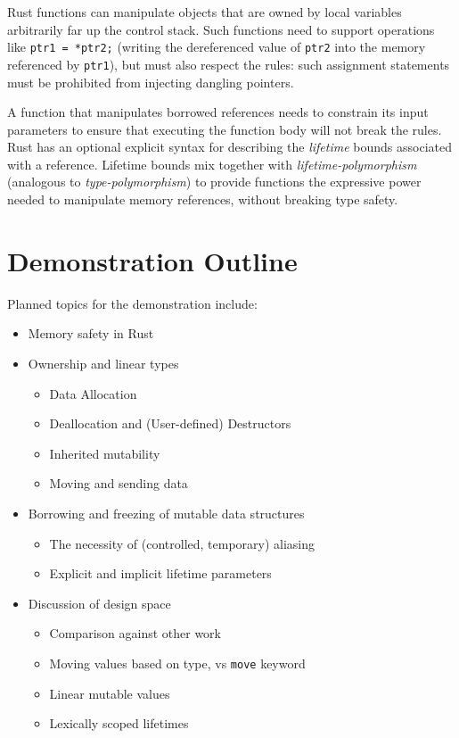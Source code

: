 \documentclass{acm_proc_article-sp}
\begin{document}
Rust functions can manipulate objects that are owned by local
variables arbitrarily far up the control stack.  Such functions need to
support operations like {\tt *ptr1 = *ptr2;} (writing the dereferenced
value of {\tt ptr2} into the memory referenced by {\tt ptr1}), but must
also respect the rules: such assignment statements
must be prohibited from injecting dangling pointers.

A function that manipulates borrowed references needs to
constrain its input parameters to ensure that
executing the function body will not break the rules.
%
Rust has an optional explicit syntax for describing the {\em lifetime}
bounds associated with a reference. Lifetime bounds mix together with
{\em lifetime-{}polymorphism} (analogous to {\em type-polymorphism})
to provide functions the expressive power needed to manipulate
memory references, without breaking type safety.

\section{Demonstration Outline}

Planned topics for the demonstration include:
\begin{itemize}
\item Memory safety in Rust
\item Ownership and linear types
\begin{itemize}
\item Data Allocation
\item Deallocation and (User-defined) Destructors
\item Inherited mutability
\item Moving and sending data
\end{itemize}
\item Borrowing and freezing of mutable data structures
\begin{itemize}
\item The necessity of (controlled, temporary) aliasing
\item Explicit and implicit lifetime parameters
\end{itemize}
\item Discussion of design space
\begin{itemize}
\item Comparison against other work
\item Moving values based on type, vs {\tt move} keyword
\item Linear mutable values
\item Lexically scoped lifetimes
\end{itemize}
\end{itemize}
\end{document}

